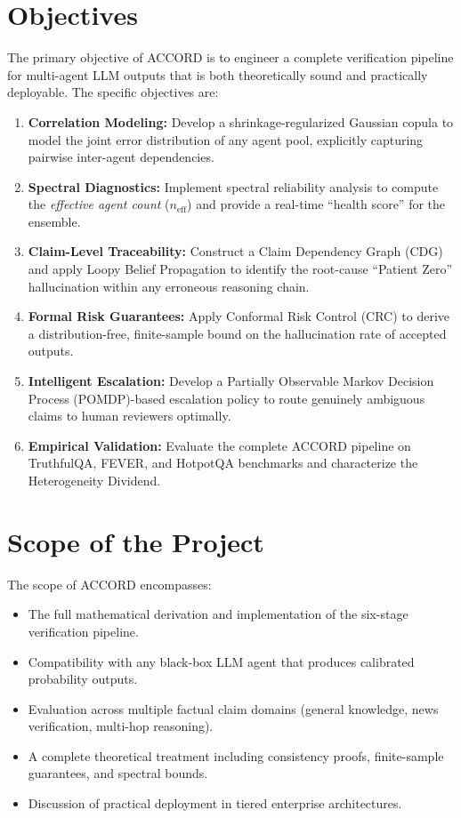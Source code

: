 \documentclass[12pt,a4paper]{report}
\begin{document}
\section{Objectives}

The primary objective of ACCORD is to engineer a complete verification pipeline for multi-agent LLM outputs that is both theoretically sound and practically deployable. The specific objectives are:

\begin{enumerate}
    \item \textbf{Correlation Modeling:} Develop a shrinkage-regularized Gaussian copula to model the joint error distribution of any agent pool, explicitly capturing pairwise inter-agent dependencies.
    \item \textbf{Spectral Diagnostics:} Implement spectral reliability analysis to compute the \emph{effective agent count} ($n_{\text{eff}}$) and provide a real-time ``health score'' for the ensemble.
    \item \textbf{Claim-Level Traceability:} Construct a Claim Dependency Graph (CDG) and apply Loopy Belief Propagation to identify the root-cause ``Patient Zero'' hallucination within any erroneous reasoning chain.
    \item \textbf{Formal Risk Guarantees:} Apply Conformal Risk Control (CRC) to derive a distribution-free, finite-sample bound on the hallucination rate of accepted outputs.
    \item \textbf{Intelligent Escalation:} Develop a Partially Observable Markov Decision Process (POMDP)-based escalation policy to route genuinely ambiguous claims to human reviewers optimally.
    \item \textbf{Empirical Validation:} Evaluate the complete ACCORD pipeline on TruthfulQA, FEVER, and HotpotQA benchmarks and characterize the Heterogeneity Dividend.
\end{enumerate}

\section{Scope of the Project}

The scope of ACCORD encompasses:
\begin{itemize}
    \item The full mathematical derivation and implementation of the six-stage verification pipeline.
    \item Compatibility with any black-box LLM agent that produces calibrated probability outputs.
    \item Evaluation across multiple factual claim domains (general knowledge, news verification, multi-hop reasoning).
    \item A complete theoretical treatment including consistency proofs, finite-sample guarantees, and spectral bounds.
    \item Discussion of practical deployment in tiered enterprise architectures.
\end{itemize}
\end{document}
